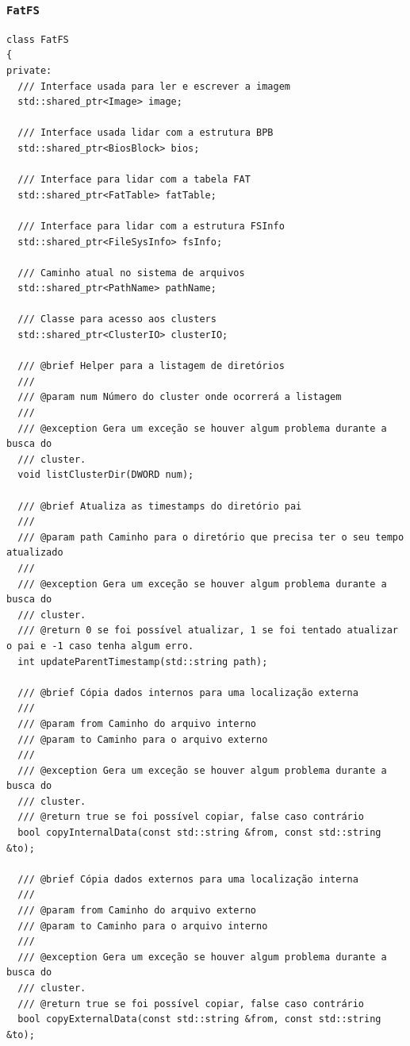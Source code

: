 \documentclass[
    12pt,				%
    oneside,   	        %
    a4paper,			%
    english,			%
    french,				%
    spanish,			%
    brazil,				%
    ]{pacotes/abntex2}
\begin{document}
\subsubsection{\texttt{FatFS}}
\label{subsubsec:fatfs}

\begin{lstlisting}[caption={Classe que expõe as interfaces de interação com o sistema de arquivos}, label={lst:fatfs}]
class FatFS
{
private:
  /// Interface usada para ler e escrever a imagem
  std::shared_ptr<Image> image;

  /// Interface usada lidar com a estrutura BPB
  std::shared_ptr<BiosBlock> bios;

  /// Interface para lidar com a tabela FAT
  std::shared_ptr<FatTable> fatTable;

  /// Interface para lidar com a estrutura FSInfo
  std::shared_ptr<FileSysInfo> fsInfo;

  /// Caminho atual no sistema de arquivos
  std::shared_ptr<PathName> pathName;

  /// Classe para acesso aos clusters
  std::shared_ptr<ClusterIO> clusterIO;

  /// @brief Helper para a listagem de diretórios
  ///
  /// @param num Número do cluster onde ocorrerá a listagem
  ///
  /// @exception Gera um exceção se houver algum problema durante a busca do
  /// cluster.
  void listClusterDir(DWORD num);

  /// @brief Atualiza as timestamps do diretório pai
  ///
  /// @param path Caminho para o diretório que precisa ter o seu tempo atualizado
  ///
  /// @exception Gera um exceção se houver algum problema durante a busca do
  /// cluster.
  /// @return 0 se foi possível atualizar, 1 se foi tentado atualizar o pai e -1 caso tenha algum erro.
  int updateParentTimestamp(std::string path);

  /// @brief Cópia dados internos para uma localização externa
  ///
  /// @param from Caminho do arquivo interno
  /// @param to Caminho para o arquivo externo
  ///
  /// @exception Gera um exceção se houver algum problema durante a busca do
  /// cluster.
  /// @return true se foi possível copiar, false caso contrário
  bool copyInternalData(const std::string &from, const std::string &to);

  /// @brief Cópia dados externos para uma localização interna
  ///
  /// @param from Caminho do arquivo externo
  /// @param to Caminho para o arquivo interno
  ///
  /// @exception Gera um exceção se houver algum problema durante a busca do
  /// cluster.
  /// @return true se foi possível copiar, false caso contrário
  bool copyExternalData(const std::string &from, const std::string &to);


\end{lstlisting}
\end{document}
